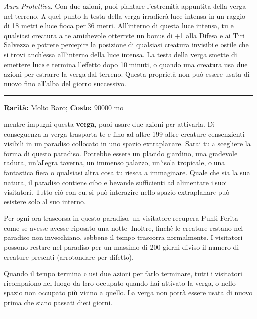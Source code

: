 \begin{multicols}{2}
\emph{Aura Protettiva}. Con due azioni, puoi piantare l'estremità appuntita della verga nel terreno. A quel punto la testa della verga irradierà luce intensa in un raggio di 18 metri e luce fioca per 36 metri. All'interno di questa luce intensa, tu e qualsiasi creatura a te amichevole otterrete un bonus di +1 alla Difesa e ai Tiri Salvezza e potrete percepire la posizione di qualsiasi creatura invisibile ostile che si trovi anch'essa all'interno della luce intensa. La testa della verga smette di emettere luce e termina l'effetto dopo 10 minuti, o quando una creatura usa due azioni per estrarre la verga dal terreno. Questa proprietà non può essere usata di nuovo fino all'alba del giorno successivo.

\smallskip\noindent\rule{\linewidth}{2pt}  \hypertarget{VergadellaSicurezza}{}\smallskip{}\noindent\label{VergadellaSicurezza}

\textbf{Rarità:} Molto Raro; \textbf{Costo:} 90000 mo

mentre impugni questa \textbf{verga}, puoi usare due azioni per attivarla. Di conseguenza la verga trasporta te e fino ad altre 199 altre creature consenzienti visibili in un paradiso collocato in uno spazio extraplanare. Sarai tu a scegliere la forma di questo paradiso. Potrebbe essere un placido giardino, una gradevole radura, un'allegra taverna, un immenso palazzo, un'isola tropicale, o una fantastica fiera o qualsiasi altra cosa tu riesca a immaginare. Quale che sia la sua natura, il paradiso contiene cibo e bevande sufficienti ad alimentare i suoi visitatori. Tutto ciò con cui si può interagire nello spazio extraplanare può esistere solo al suo interno.

Per ogni ora trascorsa in questo paradiso, un visitatore recupera Punti Ferita come se avesse avesse riposato una notte. Inoltre, finché le creature restano nel paradiso non invecchiano, sebbene il tempo trascorra normalmente. I visitatori possono restare nel paradiso per un massimo di 200 giorni diviso il numero di creature presenti (arrotondare per difetto).

Quando il tempo termina o usi due azioni per farlo terminare, tutti i visitatori ricompaiono nel luogo da loro occupato quando hai attivato la verga, o nello spazio non occupato più vicino a quello. La verga non potrà essere usata di nuovo prima che siano passati dieci giorni.

\smallskip\noindent\rule{\linewidth}{2pt}  \hypertarget{VergadellaSovranità}{}\smallskip{}\noindent\label{VergadellaSovranità}


\end{multicols}
